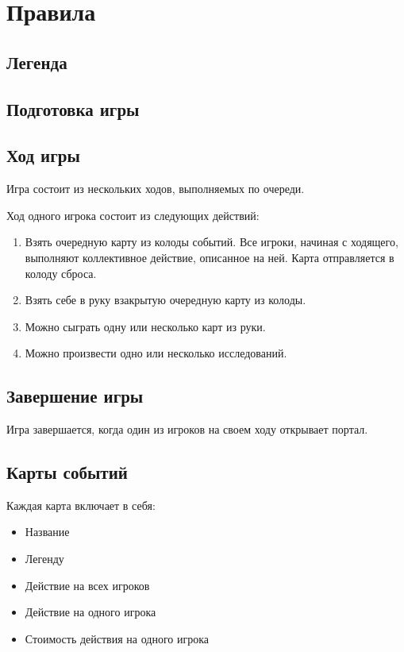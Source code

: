 \documentclass[a4paper,12pt]{article}
\begin{document}
  \section{Правила}

    \subsection{Легенда}

    \subsection{Подготовка игры}

    \subsection{Ход игры}

      Игра состоит из нескольких ходов, выполняемых по очереди.

      Ход одного игрока состоит из следующих действий:
      \begin{enumerate}
        \item Взять очередную карту из колоды событий.
          Все игроки, начиная с ходящего, выполняют коллективное
          действие, описанное на ней. Карта отправляется в колоду
          сброса.
        \item Взять себе в руку взакрытую очередную карту из колоды.
        \item Можно сыграть одну или несколько карт из руки.
        \item Можно произвести одно или несколько исследований.
      \end{enumerate}

    \subsection{Завершение игры}

      Игра завершается, когда один из игроков на своем ходу
      открывает портал. %

    \subsection{Карты событий}

      Каждая карта включает в себя:
      \begin{itemize}
        \item Название
        \item Легенду
        \item Действие на всех игроков
        \item Действие на одного игрока
        \item Стоимость действия на одного игрока
      \end{itemize}
\end{document}
